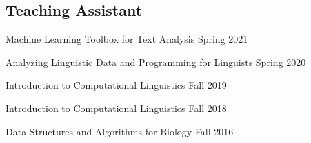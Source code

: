 \subsection{Teaching Assistant}

Machine Learning Toolbox for Text Analysis \hfill Spring 2021

Analyzing Linguistic Data and Programming for Linguists \hfill Spring 2020

Introduction to Computational Linguistics \hfill Fall 2019

Introduction to Computational Linguistics \hfill Fall 2018

Data Structures and Algorithms for Biology \hfill Fall 2016